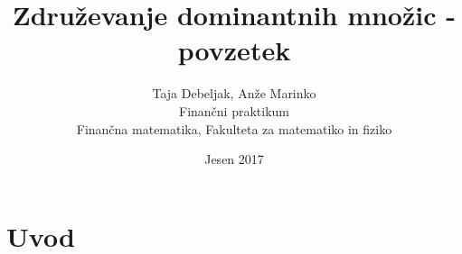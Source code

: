 \documentclass[a4paper]{article}
\title{Združevanje dominantnih množic - povzetek}
\author{Taja Debeljak, Anže Marinko \\ Finančni praktikum \\ Finančna matematika, Fakulteta za matematiko in fiziko}
\date{Jesen 2017}
\begin{document}
\maketitle
\section{Uvod}
\end{document}
